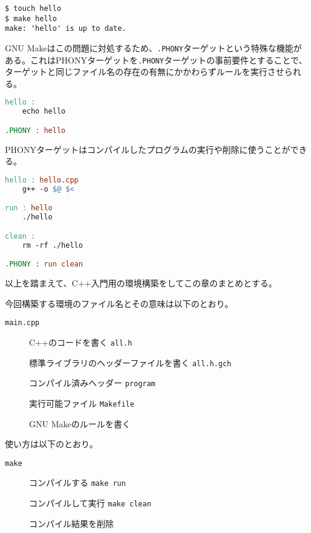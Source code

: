 \begin{lstlisting}[style=terminal]
$ touch hello
$ make hello
make: 'hello' is up to date.
\end{lstlisting}

GNU Makeはこの問題に対処するため、\texttt{.PHONY}ターゲットという特殊な機能がある。これはPHONYターゲットを\texttt{.PHONY}ターゲットの事前要件とすることで、ターゲットと同じファイル名の存在の有無にかかわらずルールを実行させられる。

\begin{lstlisting}[language=make]
hello :
    echo hello

.PHONY : hello
\end{lstlisting}

PHONYターゲットはコンパイルしたプログラムの実行や削除に使うことができる。

\begin{lstlisting}[language=make]
hello : hello.cpp
    g++ -o $@ $<

run : hello
    ./hello

clean :
    rm -rf ./hello

.PHONY : run clean
\end{lstlisting}


以上を踏まえて、C++入門用の環境構築をしてこの章のまとめとする。

今回構築する環境のファイル名とその意味は以下のとおり。

\begin{description}
\item[\texttt{main.cpp}]
C++のコードを書く \texttt{all.h}

標準ライブラリのヘッダーファイルを書く \texttt{all.h.gch}

コンパイル済みヘッダー \texttt{program}

実行可能ファイル \texttt{Makefile}

GNU Makeのルールを書く
\end{description}

使い方は以下のとおり。

\begin{description}
\item[\texttt{make}]
コンパイルする \texttt{make run}

コンパイルして実行 \texttt{make clean}

コンパイル結果を削除
\end{description}

